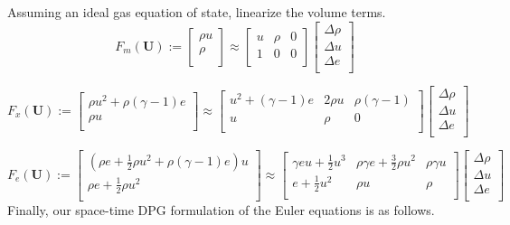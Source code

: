 \documentclass{article}
\begin{document}
Assuming an ideal gas equation of state, linearize the volume terms.
\begin{equation*}
F_m(\mathbf{U}):=
\left[
\begin{array}{c}
   \rho u\\
   \rho\\
\end{array}
\right]
\approx
\left[
\begin{array}{ccc}
   u & \rho & 0\\
   1 & 0 & 0\\
\end{array}
\right]
\left[
\begin{array}{c}
   \Delta\rho\\
   \Delta u\\
   \Delta e\\
\end{array}
\right]
\end{equation*}

\begin{equation*}
F_x(\mathbf{U}):=
\left[
\begin{array}{c}
   \rho u^2+\rho(\gamma-1)e\\
   \rho u\\
\end{array}
\right]
\approx
\left[
\begin{array}{ccc}
   u^2+(\gamma-1)e & 2\rho u & \rho(\gamma-1)\\
   u & \rho & 0\\
\end{array}
\right]
\left[
\begin{array}{c}
   \Delta\rho\\
   \Delta u\\
   \Delta e\\
\end{array}
\right]
\end{equation*}

\begin{equation*}
F_e(\mathbf{U}):=
\left[
\begin{array}{c}
   (\rho e + \frac{1}{2}\rho u^2+\rho(\gamma-1)e)u\\
   \rho e + \frac{1}{2}\rho u^2\\
\end{array}
\right]
\approx
\left[
\begin{array}{ccc}
   \gamma e u + \frac{1}{2}u^3 & \rho\gamma e + \frac{3}{2}\rho u^2 & \rho\gamma u\\
   e+\frac{1}{2} u^2 & \rho u & \rho\\
\end{array}
\right]
\left[
\begin{array}{c}
   \Delta\rho\\
   \Delta u\\
   \Delta e\\
\end{array}
\right]
\end{equation*}
Finally, our space-time DPG formulation of the Euler equations is as follows.
\end{document}
